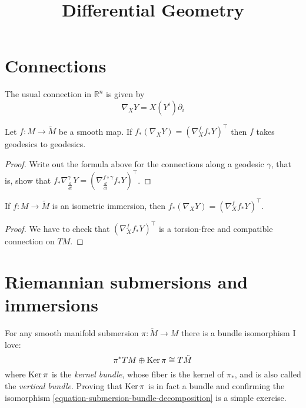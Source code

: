 



\title{Differential Geometry}
\maketitle

\label{section-phantom}

\tableofcontents

\section{Connections}
\label{section-connections}

\begin{example}
\label{example-euclidean-connection}
The usual connection in $\mathbb{R}^n$ is given by 
$$
\nabla_XY=X(Y^i)\partial_i
$$
\end{example}

\begin{proposition}
\label{proposition-map-preserves-connection-then-takes-geodesics-to-geodesics}
Let $f:M \to \tilde{M}$ be a smooth map. If 
$f_*(\nabla_XY)=(\nabla^f_Xf_*Y)^\top$ then $f$ takes geodesics to geodesics.
\end{proposition}

\begin{proof}
Write out the formula above for the connections along a geodesic $\gamma$, that
is, show that $f_*\nabla_{\frac{d}{dt}}^\gamma Y=\left(\nabla^{f\circ
\gamma}_{\frac{d}{dt}}f_*Y\right)^\top$.
\end{proof}

\begin{lemma}
\label{lemma-isometry-preserves-connection}
If $f:M \to \tilde{M}$ is an isometric immersion, then 
$f_*(\nabla_XY)=(\nabla^f_Xf_*Y)^\top$.
\end{lemma}

\begin{proof}
We have to check that $(\nabla^f_Xf_*Y)^\top$ is a torsion-free and compatible
connection on $TM$.
\end{proof}


\section{Riemannian submersions and immersions}
\label{section-Riemannian-submersions-and-immersions}

For any smooth manifold submersion $\pi:\tilde{M}\to M$ there is a bundle
isomorphism I love: 
\begin{equation}
\label{equation-submersion-bundle-decomposition}
\pi^*TM \oplus \mathop{\mathrm{Ker}} \pi\cong
T\tilde{M} \end{equation}
 where $\mathop{\mathrm{Ker}}\pi$ is the {\it kernel bundle}, whose
fiber is the kernel of $\pi_*$, and is also called the {\it vertical bundle}.
Proving that $\mathop{\mathrm{Ker}}\pi$ is in fact a bundle and confirming the isomorphism
\ref{equation-submersion-bundle-decomposition} is a simple exercise.

